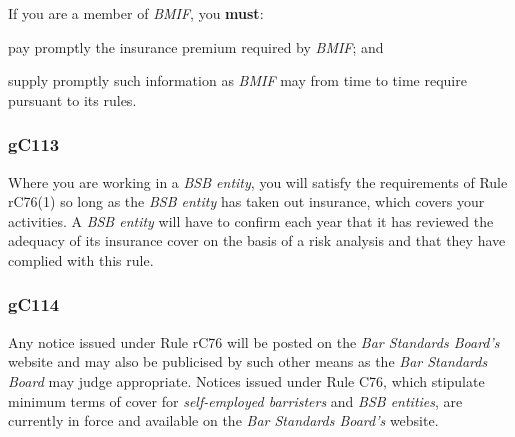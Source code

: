 If you are a member of \emph{BMIF}, you \textcolor{myred}{\textbf{must}}:

\begin{numlist}\item pay promptly the insurance premium required by \emph{BMIF}; and

\item supply promptly such information as \emph{BMIF} may from time to time
require pursuant to its rules.\end{numlist}




\subsubsection{\color{darkgrey}gC113}

Where you are working in a \emph{BSB entity}, you will satisfy the
requirements of Rule rC76(1) so long as the \emph{BSB entity} has taken
out insurance, which covers your activities. A \emph{BSB entity} will
have to confirm each year that it has reviewed the adequacy of its
insurance cover on the basis of a risk analysis and that they have
complied with this rule.

\subsubsection{\color{darkgrey}gC114}

Any notice issued under Rule rC76 will be posted on the \emph{Bar
Standards Board's} website and may also be publicised by such other
means as the \emph{Bar Standards Board} may judge appropriate. Notices
issued under Rule C76, which stipulate minimum terms of cover for
\emph{self-employed barristers} and \emph{BSB entities}, are currently
in force and available on the \emph{Bar Standards Board's} website.


